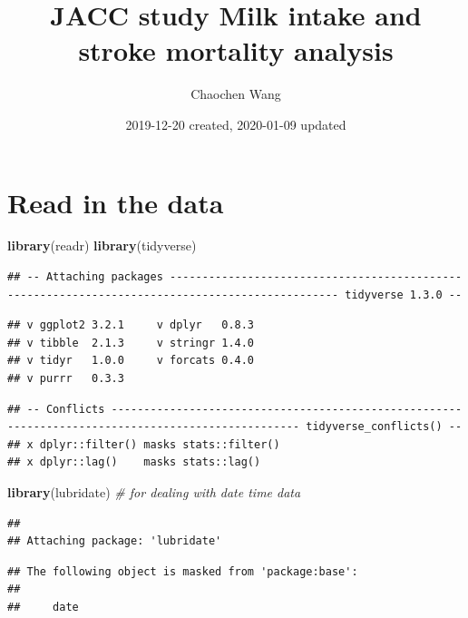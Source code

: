 \documentclass[]{article}
\title{JACC study Milk intake and stroke mortality analysis}
\author{Chaochen Wang}
\date{2019-12-20 created, 2020-01-09 updated}
\newenvironment{Shaded}{\begin{snugshade}}{\end{snugshade}}
\newcommand{\CommentTok}[1]{\textcolor[rgb]{0.56,0.35,0.01}{\textit{#1}}}
\newcommand{\KeywordTok}[1]{\textcolor[rgb]{0.13,0.29,0.53}{\textbf{#1}}}
\newcommand{\NormalTok}[1]{#1}
\begin{document}
\maketitle

{
\setcounter{tocdepth}{3}
\tableofcontents
}
\hypertarget{read-in-the-data}{%
\section{Read in the data}\label{read-in-the-data}}

\begin{Shaded}
\begin{Highlighting}[]
\KeywordTok{library}\NormalTok{(readr)}
\KeywordTok{library}\NormalTok{(tidyverse)}
\end{Highlighting}
\end{Shaded}

\begin{verbatim}
## -- Attaching packages ------------------------------------------------------------------------------------------------ tidyverse 1.3.0 --
\end{verbatim}

\begin{verbatim}
## v ggplot2 3.2.1     v dplyr   0.8.3
## v tibble  2.1.3     v stringr 1.4.0
## v tidyr   1.0.0     v forcats 0.4.0
## v purrr   0.3.3
\end{verbatim}

\begin{verbatim}
## -- Conflicts --------------------------------------------------------------------------------------------------- tidyverse_conflicts() --
## x dplyr::filter() masks stats::filter()
## x dplyr::lag()    masks stats::lag()
\end{verbatim}

\begin{Shaded}
\begin{Highlighting}[]
\KeywordTok{library}\NormalTok{(lubridate) }\CommentTok{# for dealing with date time data }
\end{Highlighting}
\end{Shaded}

\begin{verbatim}
## 
## Attaching package: 'lubridate'
\end{verbatim}

\begin{verbatim}
## The following object is masked from 'package:base':
## 
##     date
\end{verbatim}
\end{document}
